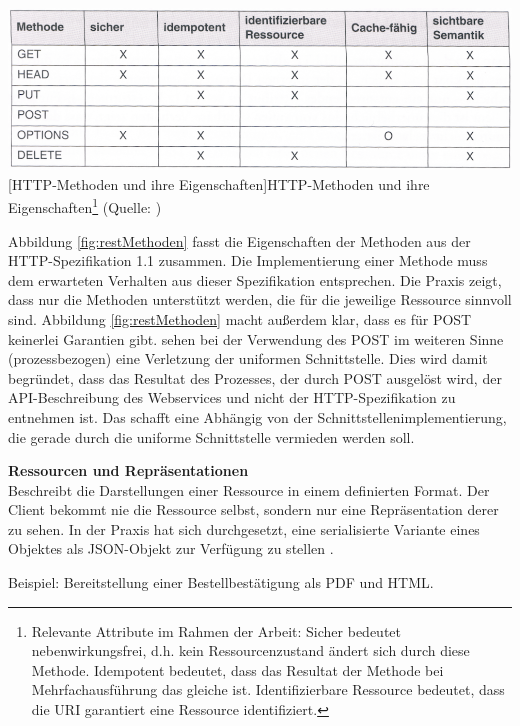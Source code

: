 \documentclass[11pt, a4paper, titlepage, listof=totoc, bibliography=totoc, index=totoc, twoside, openright, headings=normal]{scrreprt}
\begin{document}
\vspace{1em}
\begin{minipage}{\linewidth}
	\centering
	\includegraphics[width=0.7\linewidth]{Abbildungen/restMethoden.png}
	[HTTP-Methoden und ihre Eigenschaften]{HTTP-Methoden und ihre Eigenschaften\footnote{Relevante Attribute im Rahmen der Arbeit: \glqq Sicher\grqq{} bedeutet nebenwirkungsfrei, d.h. kein Ressourcenzustand ändert sich durch diese Methode. \glqq Idempotent\grqq{} bedeutet, dass das Resultat der Methode bei Mehrfachausführung das gleiche ist. \glqq Identifizierbare Ressource\grqq{} bedeutet, dass die URI garantiert eine Ressource identifiziert.}
	(Quelle: \citet{tilkov11})}
	\label{fig:restMethoden}
\end{minipage}
\vspace{1em}

Abbildung \ref{fig:restMethoden} fasst die Eigenschaften der Methoden aus der HTTP-Spezifikation 1.1 zusammen. Die Implementierung einer Methode muss dem erwarteten Verhalten aus dieser Spezifikation entsprechen. Die Praxis zeigt, dass nur die Methoden unterstützt werden, die für die jeweilige Ressource sinnvoll sind. Abbildung \ref{fig:restMethoden} macht außerdem klar, dass es für POST keinerlei Garantien gibt. \citet{richardson07} sehen bei der Verwendung des POST im weiteren Sinne (prozessbezogen) eine Verletzung der uniformen Schnittstelle. Dies wird damit begründet, dass das Resultat des Prozesses, der durch POST ausgelöst wird, der API-Beschreibung des Webservices und nicht der HTTP-Spezifikation zu entnehmen ist. Das schafft eine Abhängig von der Schnittstellenimplementierung, die gerade durch die uniforme Schnittstelle vermieden werden soll.

\textbf{Ressourcen und Repräsentationen}\\
Beschreibt die Darstellungen einer Ressource in einem definierten Format. Der Client bekommt nie die Ressource selbst, sondern nur eine Repräsentation derer zu sehen. In der Praxis hat sich durchgesetzt, eine serialisierte Variante eines Objektes als JSON-Objekt zur Verfügung zu stellen \citep{tilkov11}.

Beispiel: Bereitstellung einer Bestellbestätigung als PDF und HTML.
\end{document}
